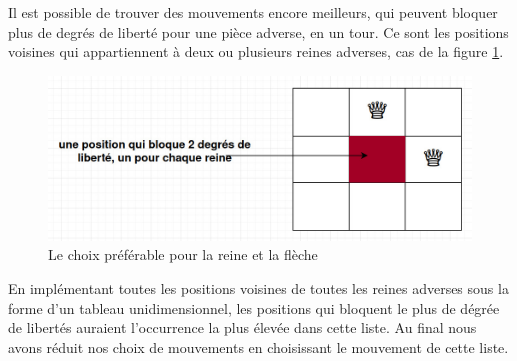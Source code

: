 \documentclass[11pt]{article}
\begin{document}
 Il est possible de trouver des mouvements encore meilleurs, qui peuvent bloquer plus de degrés de liberté pour une pièce adverse, en un tour. Ce sont les positions voisines qui appartiennent à deux ou plusieurs reines adverses, cas de la figure \ref{fig:neighbors_pref}.
                  \begin{figure}[h]
                \centering
                \includegraphics[scale=0.3]{strat.jpeg}
                \caption{Le choix préférable pour la reine et la flèche }
                \label{fig:neighbors_pref}
            \end{figure}

 
 En implémentant toutes les positions voisines de toutes les reines adverses sous la forme d'un tableau unidimensionnel, les positions qui bloquent le plus de dégrée de libertés auraient l'occurrence la plus élevée dans cette liste.
 Au final nous avons réduit nos choix de mouvements en choisissant le mouvement de cette liste.
 
\end{document}
